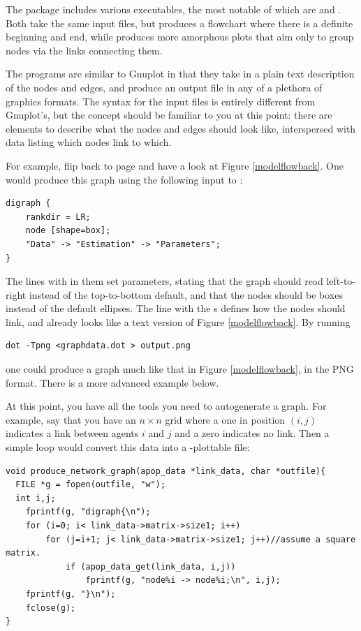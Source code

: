 The package includes various executables, the most notable of which are
 and . Both take the same input files, but 
produces a flowchart where there is a definite beginning and end, while
 produces more amorphous plots that aim only to group nodes
via the links connecting them. 

The programs are similar to Gnuplot in that they take in a plain text
description of the nodes and edges, and produce an output file in any of
a plethora of graphics formats.  The syntax for the input files is 
entirely different from Gnuplot's, but the concept should be familiar to
you at this point: there are elements to describe what the nodes and
edges should look like, interspersed with data listing which nodes link
to which. 

For example, flip back to page \pageref{modelflowback} and have a look at
Figure \ref{modelflowback}. One would produce this graph using the following
input to :

\begin{lstlisting}
digraph {
    rankdir = LR;
    node [shape=box];
    "Data" -> "Estimation" -> "Parameters";
}
\end{lstlisting}
The lines with \ci{=} in them set parameters, stating that the
graph should read left-to-right instead of the top-to-bottom
default, and that the nodes should be boxes instead of the default
ellipses. The line with the \ci{->}s defines how the nodes should link,
and already looks like a text version of Figure \ref{modelflowback}.  By running
\begin{lstlisting}
dot -Tpng <graphdata.dot > output.png
\end{lstlisting}
one could produce a graph much like that in Figure \ref{modelflowback},
in the PNG format. There is a more advanced example below.

At this point, you have all the tools you need to autogenerate a graph.
For example, say that you have an $n \times n$ grid where a
one in position $(i,j)$ indicates a link between agents $i$ and $j$ and
a zero indicates no link.
Then a simple  loop would convert this data into a
-plottable file:
\begin{lstlisting}
void produce_network_graph(apop_data *link_data, char *outfile){
  FILE *g = fopen(outfile, "w");
  int i,j;
    fprintf(g, "digraph{\n");
    for (i=0; i< link_data->matrix->size1; i++)
        for (j=i+1; j< link_data->matrix->size1; j++)//assume a square matrix.
            if (apop_data_get(link_data, i,j))
                fprintf(g, "node%i -> node%i;\n", i,j);
    fprintf(g, "}\n");
    fclose(g);
}
\end{lstlisting}
 
